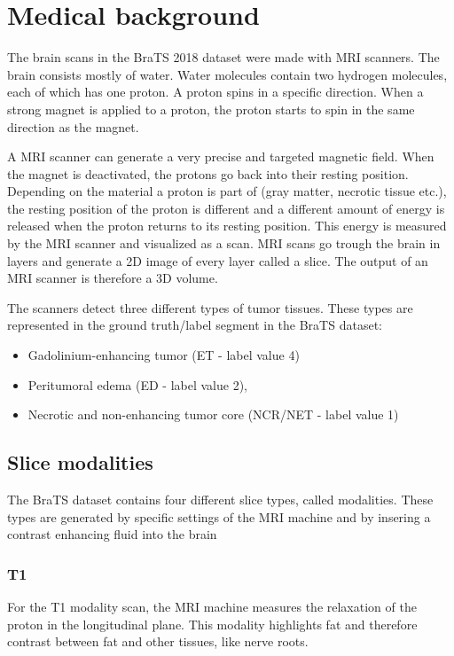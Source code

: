 \section{Medical background}
The brain scans in the BraTS\cite{menze2015multimodal} 2018 dataset were made with MRI scanners\cite{mriscanner}.
The brain consists mostly of water. Water molecules contain two hydrogen molecules, each of which has one proton. A proton spins in a specific direction. When a strong magnet is applied to a proton, the proton starts to spin in the same direction as the magnet. 

A MRI scanner can generate a very precise and targeted magnetic field. When the magnet is deactivated, the protons go back into their resting position. Depending on the material a proton is part of (gray matter, necrotic tissue etc.), the resting position of the proton is different and a different amount of energy is released when the proton returns to its resting position. This energy is measured by the MRI scanner and visualized as a scan. MRI scans go trough the brain in layers and generate a 2D image of every layer called a slice. The output of an MRI scanner is therefore a 3D volume.

The scanners detect three different types of tumor tissues. These types are represented in the ground truth/label segment in the BraTS dataset:

\begin{itemize}
    \item Gadolinium-enhancing tumor (ET - label value 4)
    \item Peritumoral edema (ED - label value 2),
    \item Necrotic and non-enhancing tumor core (NCR/NET - label value 1)
\end{itemize}




\subsection{Slice modalities}
The BraTS dataset contains four different slice types, called modalities. These types are generated by specific settings of the MRI machine and by insering a contrast enhancing fluid into the brain

\subsubsection{T1}
For the T1 modality scan, the MRI machine measures the relaxation of the proton in the longitudinal plane. This modality highlights fat and therefore contrast between fat and other tissues, like nerve roots.

